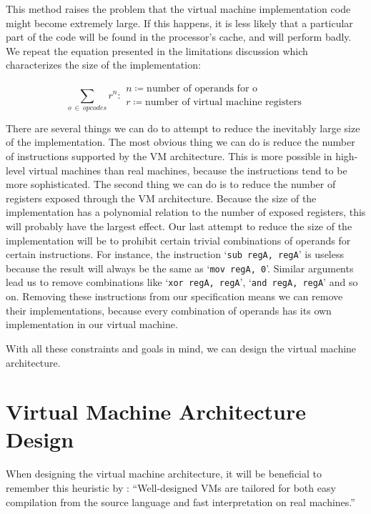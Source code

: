 	This method raises the problem that the virtual machine implementation code might become extremely large. If this happens, it is less likely that a particular part of the code will be found in the processor's cache, and will perform badly. We repeat the equation presented in the limitations discussion which characterizes the size of the implementation:
	
	\[
	\sum_{o~\in~opcodes} r^n : 
	\begin{array}{l}
	n \coloneqq \text{number of operands for o} \\
	r \coloneqq \text{number of virtual machine registers}
	\end{array}
	\] 
	
	There are several things we can do to attempt to reduce the inevitably large size of the implementation. The most obvious thing we can do is reduce the number of instructions supported by the VM architecture. This is more possible in high-level virtual machines than real machines, because the instructions tend to be more sophisticated. The second thing we can do is to reduce the number of registers exposed through the VM architecture. Because the size of the implementation has a polynomial relation to the number of exposed registers, this will probably have the largest effect. Our last attempt to reduce the size of the implementation will be to prohibit certain trivial combinations of operands for certain instructions. For instance, the instruction `\texttt{sub regA, regA}' is useless because the result will always be the same as `\texttt{mov regA, 0}'. Similar arguments lead us to remove combinations like `\texttt{xor regA, regA}', `\texttt{and regA, regA}' and so on. Removing these instructions from our specification means we can remove their implementations, because every combination of operands has its own implementation in our virtual machine.
	
	
	With all these constraints and goals in mind, we can design the virtual machine architecture.
	
	\section{Virtual Machine Architecture Design}
		When designing the virtual machine architecture, it will be beneficial to remember this heuristic by \cite{structureinterpreters}: ``Well-designed VMs are tailored for both easy compilation from the source language and fast interpretation on real machines.'' 
		
